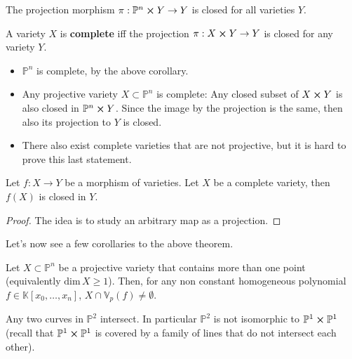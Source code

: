 \begin{cor}
	The projection morphism $\pi: \mathbb{P}^{n} \cross Y \to Y$ is closed for all varieties $Y$.
\end{cor} 

\begin{defn}
	A variety $X$ is \textbf{complete} iff the projection $\pi: X \cross Y \to Y$ is closed for any variety $Y$.
\end{defn}

\begin{ex}\leavevmode\vspace{-.2\baselineskip}
	\begin{itemize}
		\item $\mathbb{P}^{n}$ is complete, by the above corollary.
		\item Any projective variety $X \subset \mathbb{P}^{n}$ is complete:
			Any closed subset of $X \cross Y$ is also closed in $\mathbb{P}^{n} \cross Y$.
			Since the image by the projection is the same, then also its
			projection to $Y$ is closed.
		\item There also exist complete varieties that are not projective, but it is hard to prove this last statement.
	\end{itemize}
\end{ex} 

\begin{cor}
	Let $f: X \to Y$ be a morphism of varieties.
	Let $X$ be a complete variety, then
	$f(X)$ is closed in $Y$.
\end{cor} 
\begin{proof}
	The idea is to study an arbitrary map as a projection.
\end{proof}

Let's now see a few corollaries to the above theorem.

\begin{cor}
	Let $X \subset \mathbb{P}^{n}$ be a projective variety that contains more than one point (equivalently $\mathrm{dim}\, X \geq 1$).
	Then, for any non constant homogeneous polynomial $f \in \mathbb{K}\left[x_0, \ldots, x_n \right]$, $X \cap \mathbb{V}_p\left( f \right) \neq \emptyset$.
\end{cor} 

\begin{cor}
	Any two curves in $\mathbb{P}^{2}$ intersect.
	In particular $\mathbb{P}^{2}$ is not isomorphic to $\mathbb{P}^{1} \cross \mathbb{P}^{1}$ 
	(recall that $\mathbb{P}^{1} \cross \mathbb{P}^{1}$ is covered by a family of lines that do not intersect each other).
\end{cor}

